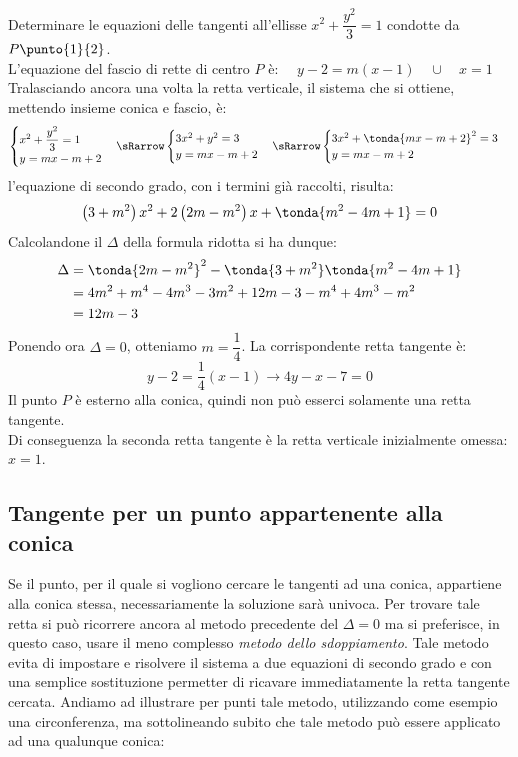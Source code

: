 \begin{esempio} Determinare le equazioni delle tangenti 
all'ellisse \(x^{2} + \dfrac{y^{2}}{3} =1\) condotte da 
\(P\punto{1}{2}\).\\[7pt]
L'equazione del fascio di rette di centro \(P\) è:  \(\quad y-2=m(x-1)\quad \cup \quad x=1\)\\[3pt]
Tralasciando ancora una volta la retta verticale, il sistema che si ottiene, mettendo insieme conica e fascio, è:
\[\begin{cases}  x^{2}+\dfrac{y^{2}}{3}=1   \\ y=mx-m+2  
\end{cases} \sRarrow  
\begin{cases}  3x^{2}+y^{2}=3   \\ y=mx-m+2  
\end{cases} \sRarrow 
\begin{cases}  3x^{2}+\tonda{mx-m+2}^2=3   \\ y=mx-m+2  
\end{cases}\]
l'equazione di secondo grado, con i termini già raccolti, risulta: 
\[\left(3+ m^{2} \right) x^{2} +2\left(2m-m^{2} \right)x+ \tonda{m^{2} -4m+1}=0\]
Calcolandone il \(\Delta\) della formula ridotta si ha dunque:
\[\begin{split}
\Delta & = \tonda{2m-m^{2}}^2 -\tonda{3+ m^{2}}\tonda{m^{2}-4m+1} \\
 & =4 m^{2} + m^{4} -4 m^{3} -3 m^{2} +12m-3- m^{4} +4 m^{3} - m^{2} \\&=12m-3
\end{split}\]
Ponendo ora \(\Delta =0\), otteniamo \(m=\dfrac{1}{4}\). La corrispondente retta tangente è:
\[y-2=\dfrac{1}{4}(x-1) \longrightarrow  4y-x-7=0\]
Il punto \(P\) è esterno alla conica, quindi non può esserci solamente una retta tangente.\\
Di conseguenza la seconda retta tangente è la retta verticale inizialmente omessa: \(x=1\).
\end{esempio}

\subsection{Tangente per un punto appartenente alla conica}

Se il punto, per il quale si vogliono cercare le tangenti ad una conica, 
appartiene alla conica stessa, necessariamente la soluzione sarà univoca. 
Per trovare tale retta si può ricorrere ancora al metodo precedente del \( \Delta =0\) ma si 
preferisce, in questo caso, usare il meno complesso \emph{metodo dello 
sdoppiamento}. Tale metodo evita di impostare e risolvere il sistema a due 
equazioni di secondo grado e con una semplice sostituzione permetter di ricavare 
immediatamente la retta tangente cercata.
Andiamo ad illustrare per punti tale metodo, utilizzando come esempio una circonferenza,
ma sottolineando subito che tale metodo può essere applicato ad una qualunque conica:


